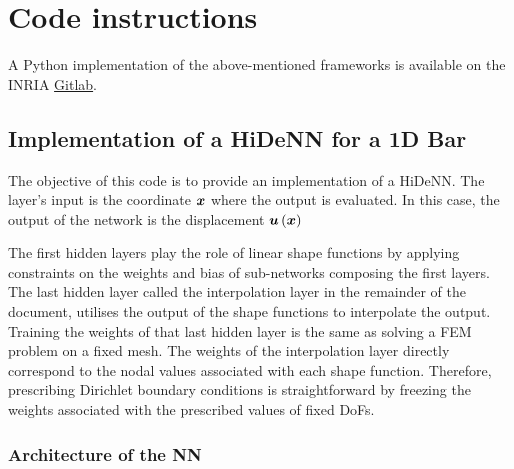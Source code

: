 \chapter[Code instructions]{Code instructions}

\begin{chapabstract}
    A Python implementation of the above-mentioned frameworks is available on the INRIA \href{https://gitlab.inria.fr/aldabyse/hidenn_1d}{Gitlab}.
\end{chapabstract}

\minitoc

\section{Implementation of a HiDeNN for a 1D Bar}

The objective of this code is to provide an implementation of a HiDeNN. The layer's input is the coordinate $\boldsymbol{x}$ where the output is evaluated. In this case, the output of the network is the displacement $\boldsymbol{u}\left(\boldsymbol{x}\right)$

The first hidden layers play the role of linear shape functions by applying constraints on the weights and bias of sub-networks composing the first layers. The last hidden layer called the interpolation layer in the remainder of the document, utilises the output of the shape functions to interpolate the output. Training the weights of that last hidden layer is the same as solving a FEM problem on a fixed mesh. The weights of the interpolation layer directly correspond to the nodal values associated with each shape function. Therefore, prescribing Dirichlet boundary conditions is straightforward by freezing the weights associated with the prescribed values of fixed DoFs.

\subsection{Architecture of the NN}


